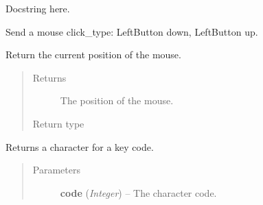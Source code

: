 \documentclass[letterpaper,10pt,english]{sphinxmanual}
\begin{document}

\begin{fulllineitems}
\label{macro:macro.MouseInput}
Docstring here.

\end{fulllineitems}


\begin{fulllineitems}
\label{macro:macro.click}
Send a mouse click\_type: LeftButton down, LeftButton up.

\end{fulllineitems}


\begin{fulllineitems}
\label{macro:macro.get_mouse_position}
Return the current position of the mouse.
\begin{quote}\begin{description}
\item[{Returns}] \leavevmode
The position of the mouse.

\item[{Return type}] \leavevmode
{\hyperref[macro:macro.MacroPoint]{}}

\end{description}\end{quote}

\end{fulllineitems}


\begin{fulllineitems}
\label{macro:macro.get_sendkeys}
Returns a character for a key code.
\begin{quote}\begin{description}
\item[{Parameters}] \leavevmode
\textbf{code} (\emph{Integer}) -- The character code.

\end{description}\end{quote}

\end{fulllineitems}
\end{document}
